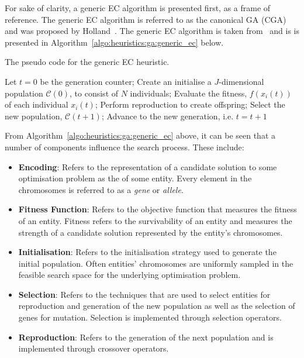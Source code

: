 For sake of clarity, a generic \acs{EC} algorithm is presented first, as a frame of reference. The generic \acs{EC} algorithm is referred to as the canonical \acs{GA} (CGA) and was proposed by Holland~\cite{ref:holland:1992}. The generic \acs{EC} algorithm is taken from~\cite{ref:engelbrecht:2007} and is is presented in Algorithm~\ref{algo:heuristics:ga:generic_ec} below.

\begin{algorithm}[H]
      \caption{The pseudo code for the generic \acs{EC} heuristic.}
      \label{algo:heuristics:ga:generic_ec}
      \begin{algorithmic}
            \State Let $t = 0$ be the generation counter;
            \State Create an initialise a $J$-dimensional population $\mathcal{C}(0)$, to consist of $N$ individuals;
            \State Evaluate the fitness, $f(x_{i}(t))$ of each individual $x_{i}(t)$;
            \State Perform reproduction to create offspring;
            \State Select the new population, $\mathcal{C}(t+1)$;
            \State Advance to the new generation, i.e. $t = t + 1$
            \EndWhile
            \State
      \end{algorithmic}
\end{algorithm}

\noindent
From Algorithm~\ref{algo:heuristics:ga:generic_ec} above, it can be seen that a number of components influence the search process. These include:

\begin{itemize}
      \item \textbf{Encoding}: Refers to the representation of a candidate solution to some optimisation problem as the  of some entity. Every element in the chromosomes is referred to as a \textit{gene} or \textit{allele}.

      \item \textbf{Fitness Function}: Refers to the objective function that measures the fitness of an entity. Fitness refers to the survivability of an entity and measures the strength of a candidate solution represented by the entity's chromosomes.

      \item \textbf{Initialisation}: Refers to the initialisation strategy used to generate the initial population. Often entities' chromosomes are uniformly sampled in the feasible search space for the underlying optimisation problem.

      \item \textbf{Selection}: Refers to the techniques that are used to select entities for reproduction and generation of the new population as well as the selection of genes for mutation. Selection is implemented through selection operators.

      \item \textbf{Reproduction}: Refers to the generation of the next population and is implemented through crossover operators.
\end{itemize}

